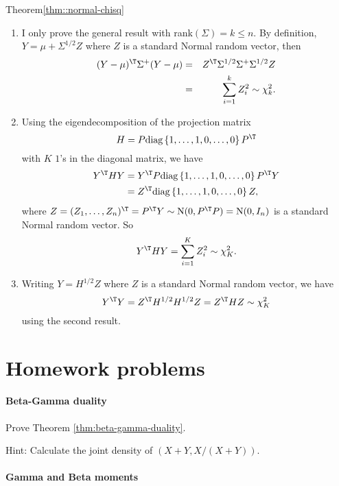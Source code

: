 \begin{myproof}{Theorem}{\ref{thm::normal-chisq}}
\begin{enumerate}
\item 
I only prove the general result with rank$(\Sigma) = k \leq n$.
By definition, $Y=\mu+\Sigma^{1/2}Z$ where $Z$ is a standard Normal
random vector, then
\begin{eqnarray*}
(Y-\mu)^{\T}\Sigma^{+}(Y-\mu)
&=&  Z^{\T}\Sigma^{1/2}\Sigma^{+}\Sigma^{1/2}Z \\
&=&  \sum_{i=1}^k Z_i^2  \sim  \chi_k^{2}.
\end{eqnarray*}
\item Using the eigendecomposition of the projection matrix
\[
H=P\text{diag}\left\{ 1,\ldots,1,0,\ldots,0\right\} P^{\T}
\]
with $K$ $1$'s in the diagonal matrix, we have
\begin{align*}
Y^{\T}HY & =Y^{\T}P\text{diag}\left\{ 1,\ldots,1,0,\ldots,0\right\} P^{\T}Y\\
 & =Z^{\T}\text{diag}\left\{ 1,\ldots,1,0,\ldots,0\right\} Z,
\end{align*}
where $Z=(Z_{1},\ldots,Z_{n})^{\T}=P^{\T}Y\sim\text{N}(0,P^{\T}P)=\text{N}(0,I_{n})$
is a standard Normal random vector. So
\[
Y^{\T}HY=\sum_{i=1}^{K}Z_{i}^{2}\sim\chi_{K}^{2}.
\]
\item Writing $Y=H^{1/2}Z$ where $Z$ is a standard Normal random vector,
we have 
\[
Y^{\T}Y=Z^{\T}H^{1/2}H^{1/2}Z=Z^{\T}HZ\sim\chi_{K}^{2}
\]
using the second result. 
\end{enumerate}
\end{myproof} 

\section{Homework problems}

\paragraph{Beta-Gamma duality}\label{hwmath2::beta-gamma-dual}

Prove Theorem \ref{thm:beta-gamma-duality}.

Hint: Calculate the joint density of $(X+Y, X/(X+Y))$. 

\paragraph{Gamma and Beta moments}\label{hwmath2::beta-gamma-moments}

